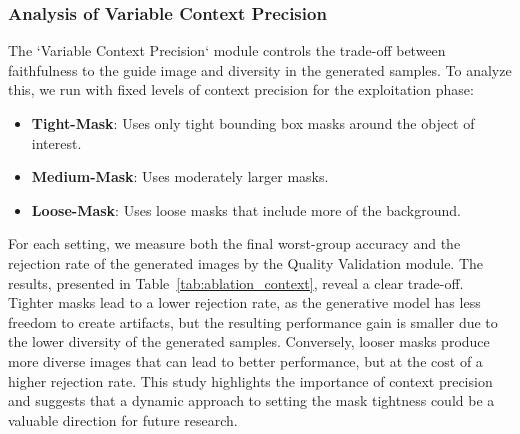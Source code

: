 \subsubsection{Analysis of Variable Context Precision}
The `Variable Context Precision` module controls the trade-off between faithfulness to the guide image and diversity in the generated samples. To analyze this, we run \system with fixed levels of context precision for the exploitation phase:
\begin{itemize}[leftmargin=*]
    \item \textbf{Tight-Mask}: Uses only tight bounding box masks around the object of interest.
    \item \textbf{Medium-Mask}: Uses moderately larger masks.
    \item \textbf{Loose-Mask}: Uses loose masks that include more of the background.
\end{itemize}

For each setting, we measure both the final worst-group accuracy and the rejection rate of the generated images by the Quality Validation module. The results, presented in Table~\ref{tab:ablation_context}, reveal a clear trade-off. Tighter masks lead to a lower rejection rate, as the generative model has less freedom to create artifacts, but the resulting performance gain is smaller due to the lower diversity of the generated samples. Conversely, looser masks produce more diverse images that can lead to better performance, but at the cost of a higher rejection rate. This study highlights the importance of context precision and suggests that a dynamic approach to setting the mask tightness could be a valuable direction for future research.


